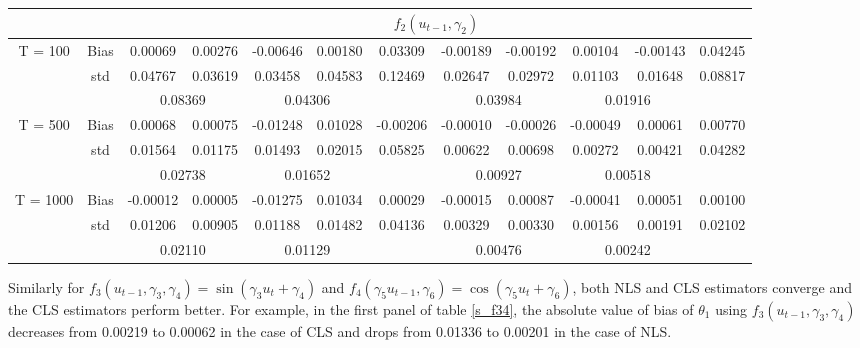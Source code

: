 \documentclass[a4paper,12pt,times,numbered,print,index]{report}
\numberwithin{equation}{section}
\begin{document}
\begin{table}[htbp]
\begin{adjustbox}{max width=\textwidth}
\begin{tabular}{cccccccccccc}
    \midrule
    &       & \multicolumn{10}{c}{$f_2 (u_{t-1}, \gamma_2)$}                \\
    \midrule
    \multirow{3}[1]{*}{T = 100} & Bias  & 0.00069 & 0.00276 & -0.00646 & 0.00180 & 0.03309 & -0.00189 & -0.00192 & 0.00104 & -0.00143 & 0.04245 \\
          & std   & 0.04767 & 0.03619 & 0.03458 & 0.04583 & 0.12469 & 0.02647 & 0.02972 & 0.01103 & 0.01648 & 0.08817 \\
          &       & \multicolumn{2}{c}{0.08369} & \multicolumn{2}{c}{0.04306} &       & \multicolumn{2}{c}{0.03984} & \multicolumn{2}{c}{\textcolor[rgb]{ .329,  .51,  .208}{0.01916}} &  \\
    \multirow{3}[0]{*}{T = 500} & Bias  & 0.00068 & 0.00075 & -0.01248 & 0.01028 & -0.00206 & -0.00010 & -0.00026 & -0.00049 & 0.00061 & 0.00770 \\
          & std   & 0.01564 & 0.01175 & 0.01493 & 0.02015 & 0.05825 & 0.00622 & 0.00698 & 0.00272 & 0.00421 & 0.04282 \\
          &       & \multicolumn{2}{c}{0.02738} & \multicolumn{2}{c}{0.01652} &       & \multicolumn{2}{c}{0.00927} & \multicolumn{2}{c}{\textcolor[rgb]{ .329,  .51,  .208}{0.00518}} &  \\
    \multirow{3}[1]{*}{T = 1000} & Bias  & -0.00012 & 0.00005 & -0.01275 & 0.01034 & 0.00029 & -0.00015 & 0.00087 & -0.00041 & 0.00051 & 0.00100 \\
          & std   & 0.01206 & 0.00905 & 0.01188 & 0.01482 & 0.04136 & 0.00329 & 0.00330 & 0.00156 & 0.00191 & 0.02102 \\
          &       & \multicolumn{2}{c}{0.02110} & \multicolumn{2}{c}{0.01129} &       & \multicolumn{2}{c}{0.00476} & \multicolumn{2}{c}{\textcolor[rgb]{ .329,  .51,  .208}{0.00242}} &  \\
    \bottomrule
    \bottomrule
    \end{tabular}%
    \end{adjustbox}
  \label{tab:s_f12}%
\end{table}%


Similarly for $f_3(u_{t-1},\gamma_3, \gamma_4) = \sin(\gamma_3 u_t+\gamma_{4})$ and $f_4(\gamma_5 u_{t-1}, \gamma_6) = \cos(\gamma_5 u_t+\gamma_{6})$, both NLS and CLS estimators converge and the CLS estimators perform better. For example, in the first panel of table \ref{s_f34}, the absolute value of bias of $\theta_1$ using $f_3(u_{t-1}, \gamma_3, \gamma_4)$ decreases from 0.00219 to 0.00062 in the case of CLS and drops from 0.01336 to 0.00201 in the case of NLS. 
\end{document}
